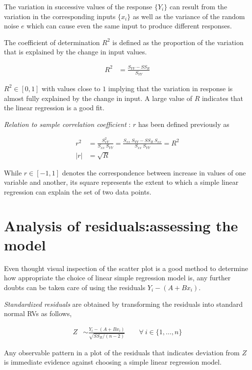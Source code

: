 The variation in successive values of the response $ \{Y_i\} $ can result from the variation in the corresponding inputs $ \{x_i\} $ as well as the variance of the random noise $ e $ which can cause even the same input to produce different responses.

The coefficient of determination $ R^2 $ is defined as the proportion of the variation that is explained by the change in input values.

\begin{align}
	R^2 &= \frac{S_{YY} - SS_R}{S_{YY}}
\end{align}

$ R^2 \in [0, 1] $ with values close to $ 1 $ implying that the variation in response is almost fully explained by the change in input. A large value of $ R $ indicates that the linear regression is a good fit.


\textit{Relation to sample correlation coefficient} : $ r $ has been defined previously as

\begin{align}
	r^2 &= \frac{S^2_{xY}}{S_{xx}\ S_{YY}} = \frac{S_{xx} \ S_{YY} - SS_R \ S_{xx}}{S_{xx}\ S_{YY}} = R^2 \\
	|r| &= \sqrt{R}
\end{align}

While $ r \in [-1, 1] $ denotes the correspondence between increase in values of one variable and another, its square represents the extent to which a simple linear regression can explain the set of two data points.

\section{Analysis of residuals:assessing the model}

Even thought visual inspection of the scatter plot is a good method to determine how appropriate the choice of linear simple regression model is, any further doubts can be taken care of using the residuals $ Y_i - (A + B x_i) $.

\textit{Standardized residuals} are obtained by transforming the residuals into standard normal RVs as follows,

\begin{align}
	Z &\sim \frac{Y_i - (A + B x_i)}{\sqrt{SS_R / (n-2)}} \qquad \forall\ i\in \{1,\dots, n\}
\end{align}

Any observable pattern in a plot of the residuals that indicates deviation from $ Z $ is immediate evidence against choosing a simple linear regression model.

